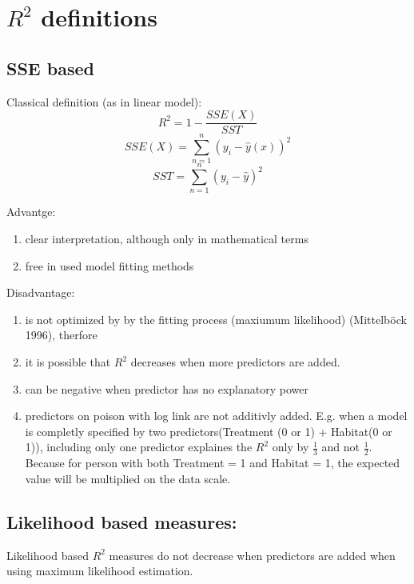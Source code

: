 \documentclass[11pt, a4paper]{article}\usepackage[]{graphicx}\usepackage[]{color}
\begin{document}
\section{$R^2$ definitions} \label{sec:data}
\subsection{SSE based}

Classical definition (as in linear model):\begin{equation} R^2 = 1 - \frac{SSE(X)}{SST} \end{equation}
 \begin{equation}SSE(X) = \sum_{n=1}^{n}(y_{i} - \hat{y}(x))^2  \end{equation}
 \begin{equation} SST = \sum_{n=1}^{n}(y_{i} - \hat{y})^2 \end{equation}

Advantge:
\begin {enumerate}
\item clear interpretation, although only in mathematical terms
\item free in used model fitting methods 
\end{enumerate}

Disadvantage:
\begin {enumerate}
\item is not optimized by by the fitting process (maxiumum likelihood) (Mittelböck 1996), therfore
\item  it is possible that $R^2$ decreases when more predictors are added.
\item can be negative when predictor has no explanatory power
\item predictors on poison with log link are not additivly added. E.g. when a model is completly specified by two predictors(Treatment (0 or 1) + Habitat(0 or 1)), including only one predictor explaines the $R^2$ only by $\frac{1}{3}$ and not $\frac{1}{2}$. Because for person with both Treatment = 1 and Habitat = 1, the expected value will be multiplied on the data scale.
\end{enumerate}


\subsection{Likelihood based measures:} 

Likelihood based $R^2$ measures do not decrease when predictors are added when using maximum likelihood estimation.
\end{document}
